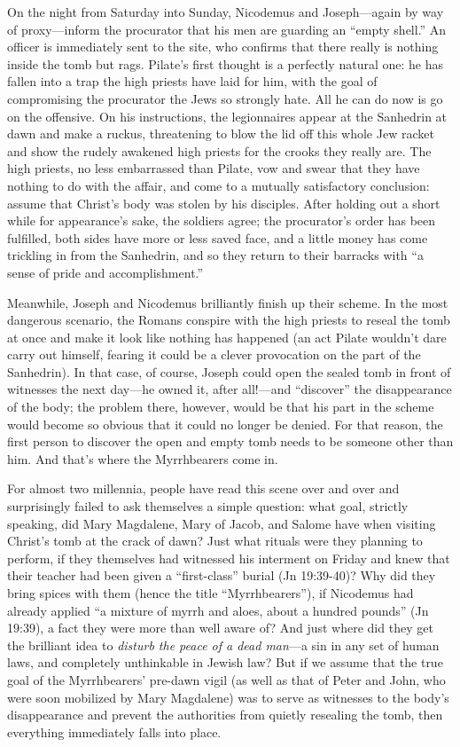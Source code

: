 On the night from Saturday into Sunday, Nicodemus and Joseph---again by way of proxy---inform the procurator that his men are guarding an ``empty shell.'' An officer is immediately sent to the site, who confirms that there really is nothing inside the tomb but rags. Pilate's first thought is a perfectly natural one: he has fallen into a trap the high priests have laid for him, with the goal of compromising the procurator the Jews so strongly hate. All he can do now is go on the offensive. On his instructions, the legionnaires appear at the Sanhedrin at dawn and make a ruckus, threatening to blow the lid off this whole Jew racket and show the rudely awakened high priests for the crooks they really are. The high priests, no less embarrassed than Pilate, vow and swear that they have nothing to do with the affair, and come to a mutually satisfactory conclusion: assume that Christ's body was stolen by his disciples. After holding out a short while for appearance's sake, the soldiers agree; the procurator's order has been fulfilled, both sides have more or less saved face, and a little money has come trickling in from the Sanhedrin, and so they return to their barracks with ``a sense of pride and accomplishment.''

Meanwhile, Joseph and Nicodemus brilliantly finish up their scheme. In the most dangerous scenario, the Romans conspire with the high priests to reseal the tomb at once and make it look like nothing has happened (an act Pilate wouldn't dare carry out himself, fearing it could be a clever provocation on the part of the Sanhedrin). In that case, of course, Joseph could open the sealed tomb in front of witnesses the next day---he owned it, after all!---and ``discover'' the disappearance of the body; the problem there, however, would be that his part in the scheme would become so obvious that it could no longer be denied. For that reason, the first person to discover the open and empty tomb needs to be someone other than him. And that's where the Myrrhbearers come in.

For almost two millennia, people have read this scene over and over and surprisingly failed to ask themselves a simple question: what goal, strictly speaking, did Mary Magdalene, Mary of Jacob, and Salome have when visiting Christ's tomb at the crack of dawn? Just what rituals were they planning to perform, if they themselves had witnessed his interment on Friday and knew that their teacher had been given a ``first-class'' burial (Jn 19:39-40)? Why did they bring spices with them (hence the title ``Myrrhbearers''), if Nicodemus had already applied ``a mixture of myrrh and aloes, about a hundred pounds'' (Jn 19:39), a fact they were more than well aware of? And just where did they get the brilliant idea to \emph{disturb the peace of a dead man}---a sin in any set of human laws, and completely unthinkable in Jewish law? But if we assume that the true goal of the Myrrhbearers' pre-dawn vigil (as well as that of Peter and John, who were soon mobilized by Mary Magdalene) was to serve as witnesses to the body's disappearance and prevent the authorities from quietly resealing the tomb, then everything immediately falls into place.

